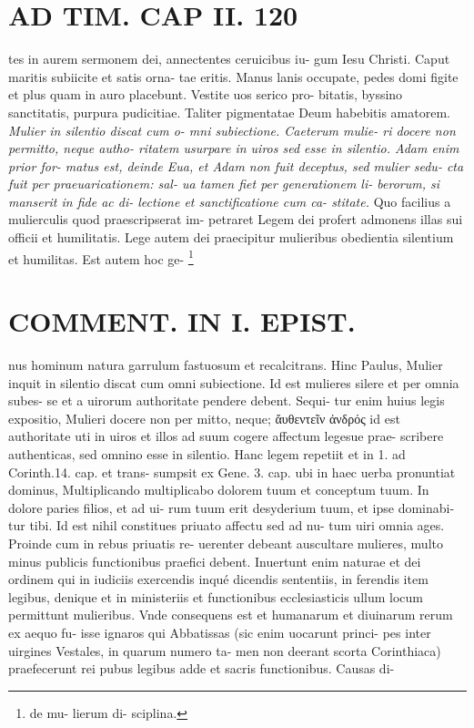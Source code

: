 \documentclass{article}
\begin{document}
\begin{pages}
\section*{AD TIM. CAP II. 120 }\pstart tes in aurem sermonem dei, annectentes ceruicibus iu- gum Iesu Christi. Caput maritis subiicite et satis orna- tae eritis. Manus lanis occupate, pedes domi figite et plus quam in auro placebunt. Vestite uos serico pro- bitatis, byssino sanctitatis, purpura pudicitiae. Taliter pigmentatae Deum habebitis amatorem.  \pend
\textit{Mulier in silentio discat cum o- mni subiectione. Caeterum mulie- ri docere non permitto, neque autho- ritatem usurpare in uiros sed esse in silentio. Adam enim prior for- matus est, deinde Eua, et Adam non fuit deceptus, sed mulier sedu- cta fuit per praeuaricationem: sal- ua tamen fiet per generationem li- berorum, si manserit in fide ac di- lectione et sanctificatione cum ca- stitate. }\pstart Quo facilius a mulierculis quod praescripserat im- petraret Legem dei profert admonens illas sui officii et humilitatis. Lege autem dei praecipitur mulieribus obedientia silentium et humilitas. Est autem hoc ge-  \pend\footnote{\footnotesizeLex de mu- lierum di- sciplina. }
\section*{COMMENT. IN I. EPIST. }\pstart nus hominum natura garrulum fastuosum et recalcitrans. Hinc Paulus, Mulier inquit in silentio discat cum omni subiectione. Id est mulieres silere et per omnia subes- se et a uirorum authoritate pendere debent. Sequi- tur enim huius legis expositio, Mulieri docere non per mitto, neque; ἄυθεντεῖν ἀνδρός id est authoritate uti in uiros et illos ad suum cogere affectum legesue prae- scribere authenticas, sed omnino esse in silentio. Hanc legem repetiit et in 1. ad Corinth.14. cap. et trans- sumpsit ex Gene. 3. cap. ubi in haec uerba pronuntiat dominus, Multiplicando multiplicabo dolorem tuum et conceptum tuum. In dolore paries filios, et ad ui- rum tuum erit desyderium tuum, et ipse dominabi- tur tibi. Id est nihil constitues priuato affectu sed ad nu- tum uiri omnia ages. Proinde cum in rebus priuatis re- uerenter debeant auscultare mulieres, multo minus publicis functionibus praefici debent. Inuertunt enim naturae et dei ordinem qui in iudiciis exercendis inqué dicendis sententiis, in ferendis item legibus, denique et in ministeriis et functionibus ecclesiasticis ullum locum permittunt mulieribus. Vnde consequens est et humanarum et diuinarum rerum ex aequo fu- isse ignaros qui Abbatissas (sic enim uocarunt princi- pes inter uirgines Vestales, in quarum numero ta- men non deerant scorta Corinthiaca) praefecerunt rei pubus  legibus adde et sacris functionibus. Causas di-  \pend

\end{pages}
\end{document}
